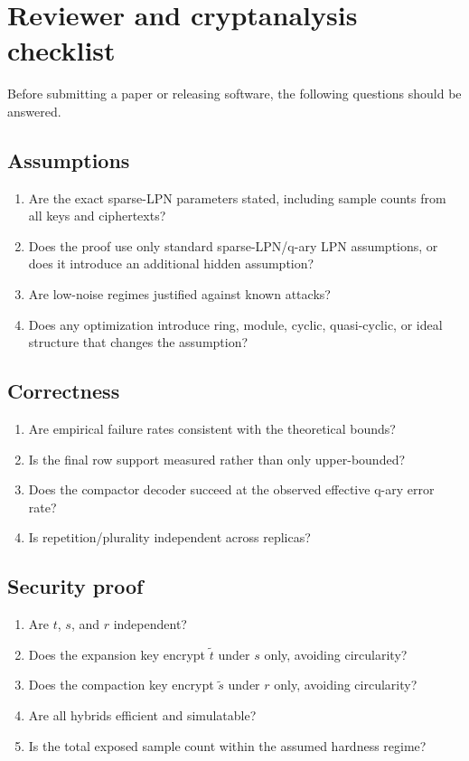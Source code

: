 \section{Reviewer and cryptanalysis checklist}
\label{app:checklist}

Before submitting a paper or releasing software, the following questions should be answered.

\subsection{Assumptions}

\begin{enumerate}
    \item Are the exact sparse-LPN parameters stated, including sample counts from all keys and ciphertexts?
    \item Does the proof use only standard sparse-LPN/q-ary LPN assumptions, or does it introduce an additional hidden assumption?
    \item Are low-noise regimes justified against known attacks?
    \item Does any optimization introduce ring, module, cyclic, quasi-cyclic, or ideal structure that changes the assumption?
\end{enumerate}

\subsection{Correctness}

\begin{enumerate}
    \item Are empirical failure rates consistent with the theoretical bounds?
    \item Is the final row support measured rather than only upper-bounded?
    \item Does the compactor decoder succeed at the observed effective q-ary error rate?
    \item Is repetition/plurality independent across replicas?
\end{enumerate}

\subsection{Security proof}

\begin{enumerate}
    \item Are $t$, $s$, and $r$ independent?
    \item Does the expansion key encrypt $\tilde{t}$ under $s$ only, avoiding circularity?
    \item Does the compaction key encrypt $\tilde{s}$ under $r$ only, avoiding circularity?
    \item Are all hybrids efficient and simulatable?
    \item Is the total exposed sample count within the assumed hardness regime?
\end{enumerate}

